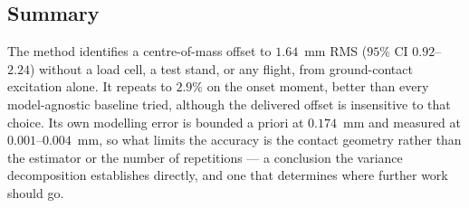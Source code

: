 
\subsection{Summary}

The method identifies a centre-of-mass offset to $1.64$~mm RMS
($95\%$ CI $0.92$--$2.24$) without a load cell, a test stand, or any
flight, from ground-contact excitation alone. It repeats to $2.9\%$ on
the onset moment, better than every model-agnostic baseline tried,
although the delivered offset is insensitive to that choice. Its own
modelling error is bounded a priori at $0.174$~mm and measured at
$0.001$--$0.004$~mm, so what limits the accuracy is the contact
geometry rather than the estimator or the number of repetitions ---
a conclusion the variance decomposition establishes directly, and one
that determines where further work should go.
